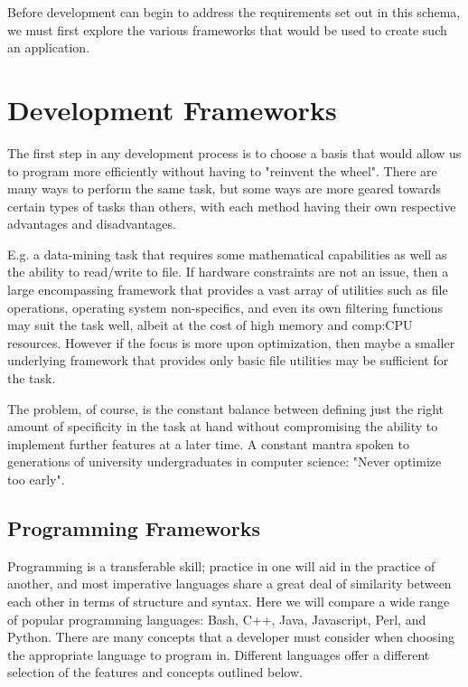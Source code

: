 Before development can begin to address the requirements set out in this schema, we must first explore the various frameworks that would be used to create such an application.


\section{Development Frameworks}

The first step in any development process is to choose a basis that would allow us to program more efficiently without having to "reinvent the wheel". There are many ways to perform the same task, but some ways are more geared towards certain types of tasks than others, with each method having their own respective advantages and disadvantages.  

E.g. a data-mining task that requires some mathematical capabilities as well as the ability to read/write to file. If hardware constraints are not an issue, then a large encompassing framework that provides a vast array of utilities such as file operations, operating system non-specifics, and even its own filtering functions may suit the task well, albeit at the cost of high memory and \gls{comp:CPU} resources. However if the focus is more upon optimization, then maybe a smaller underlying framework that provides only basic file utilities may be sufficient for the task.

The problem, of course, is the constant balance between defining just the right amount of specificity in the task at hand without compromising the ability to implement further features at a later time. A constant mantra spoken to generations of university undergraduates in computer science: "Never optimize too early".


\subsection{Programming Frameworks}

Programming is a transferable skill; practice in one will aid in the practice of another, and most imperative languages share a great deal of similarity between each other in terms of structure and syntax. Here we will compare a wide range of popular programming languages: Bash, C++, Java, Javascript, Perl, and Python. There are many concepts that a developer must consider when choosing the appropriate language to program in. Different languages offer a different selection of the features and concepts outlined below.

